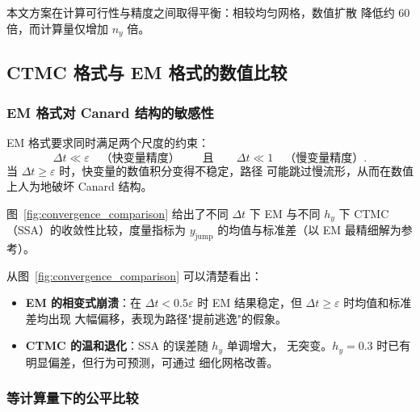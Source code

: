 本文方案在计算可行性与精度之间取得平衡：相较均匀网格，数值扩散
降低约 60 倍，而计算量仅增加 $n_y$ 倍。

\subsection{CTMC 格式与 EM 格式的数值比较}
\label{subsec:ctmc-vs-em}

\subsubsection{EM 格式对 Canard 结构的敏感性}

EM 格式要求同时满足两个尺度的约束：
\[
\Delta t \ll \varepsilon \quad \text{（快变量精度）}
\qquad \text{且} \qquad
\Delta t \ll 1 \quad \text{（慢变量精度）}.
\]
当 $\Delta t \geq \varepsilon$ 时，快变量的数值积分变得不稳定，路径
可能跳过慢流形，从而在数值上人为地破坏 Canard 结构。

图~\ref{fig:convergence_comparison} 给出了不同 $\Delta t$ 下 EM
与不同 $h_y$ 下 CTMC（SSA）的收敛性比较，度量指标为
$y_\mathrm{jump}$ 的均值与标准差（以 EM 最精细解为参考）。


从图~\ref{fig:convergence_comparison} 可以清楚看出：

\begin{itemize}
	\item \textbf{EM 的相变式崩溃}：在 $\Delta t < 0.5\varepsilon$ 时
	EM 结果稳定，但 $\Delta t \geq \varepsilon$ 时均值和标准差均出现
	大幅偏移，表现为路径"提前逃逸"的假象。
	\item \textbf{CTMC 的温和退化}：SSA 的误差随 $h_y$ 单调增大，
	无突变。$h_y = 0.3$ 时已有明显偏差，但行为可预测，可通过
	细化网格改善。
\end{itemize}

\subsubsection{等计算量下的公平比较}

